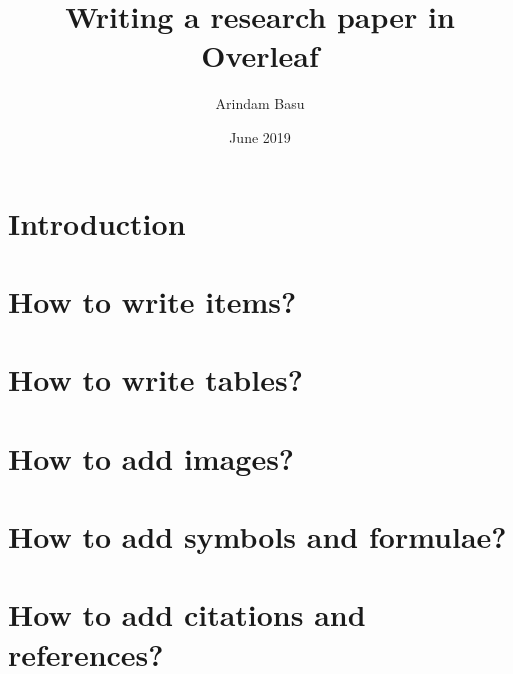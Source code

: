 \documentclass{article}
\title{Writing a research paper in Overleaf}
\author{Arindam Basu}
\date{June 2019}
\begin{document}
\maketitle

\section{Introduction}
 
\section{How to write items?}
\section{How to write tables?}
\section{How to add images?}
\section{How to add symbols and formulae?}
\section{How to add citations and references?}
\end{document}
